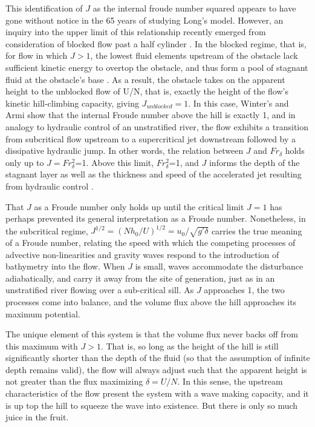 \documentclass[12pt]{article}
\begin{document}
	This identification of $J$ as the internal froude number squared appears to have gone without notice in the 65 years of studying Long's model. However, an inquiry into the upper limit of this relationship recently emerged from consideration of blocked flow past a half cylinder \citep{Winters2012}. In the blocked regime, that is, for flow in which $J>1$, the lowest fluid elements upstream of the obstacle lack sufficient kinetic energy to overtop the obstacle, and thus form a pool of stagnant fluid at the obstacle's base \citep{Baines1995}. As a result, the obstacle takes on the apparent height to the unblocked flow of U/N, that is, exactly the height of the flow's kinetic hill-climbing capacity, giving $J_{unblocked}=1$. In this case, Winter's and Armi show that the internal Froude number above the hill is exactly 1, and in analogy to hydraulic control of an unstratified river, the flow exhibits a transition from subcritical flow upstream to a supercritical jet downstream followed by a dissipative hydraulic jump. In other words, the relation between $J$ and $Fr_{\delta}$ holds only up to $J=Fr_{\delta}^2$=1. Above this limit, $Fr_{\delta}^2$=1, and $J$ informs the depth of the stagnant layer as well as the thickness and speed of the accelerated jet resulting from hydraulic control \citep{Winters2012}.
	
	That $J$ as a Froude number only holds up until the critical limit $J=1$ has perhaps prevented its general interpretation as a Froude number. Nonetheless, in the subcritical regime, $J^{1/2}=(Nh_0/U)^{1/2}=u_0/\sqrt{g'\delta}$ carries the true meaning of a Froude number, relating the speed with which the competing processes of advective non-linearities and gravity waves respond to the introduction of bathymetry into the flow. When $J$ is small, waves accommodate the disturbance adiabatically, and carry it away from the site of generation, just as in an unstratified river flowing over a sub-critical sill. As $J$ approaches 1, the two processes come into balance, and the volume flux above the hill approaches its maximum potential. 
	
	The unique element of this system is that the volume flux never backs off from this maximum with $J>1$. That is, so long as the height of the hill is still significantly shorter than the depth of the fluid (so that the assumption of infinite depth remains valid), the flow will always adjust such that the apparent height is not greater than the flux maximizing $\delta=U/N$. In this sense, the upstream characteristics of the flow present the system with a wave making capacity, and it is up top the hill to squeeze the wave into existence. But there is only so much juice in the fruit. 
	
\end{document}
